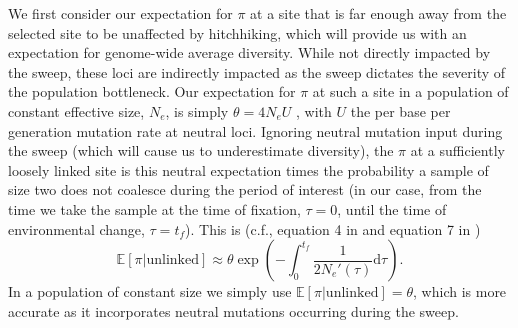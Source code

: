 \documentclass[]{article}
\begin{document}
We first consider our expectation for $\pi$ at a site that is far enough away from the selected site to be unaffected by hitchhiking, which will provide us with an expectation for  genome-wide average diversity.
While not directly impacted by the sweep, these loci are indirectly impacted as the sweep dictates the severity of the population bottleneck.
Our expectation for $\pi$ at such a site in a population of constant effective size, $N_e$, is simply $\theta = 4 N_e U$ \citep{watterson1975number}, with $U$ the per base per generation mutation rate at neutral loci.
Ignoring neutral mutation input during the sweep (which will cause us to underestimate diversity), the $\pi$ at a sufficiently loosely linked site is this neutral expectation times the probability a sample of size two does not coalesce during the period of interest (in our case, from the time we take the sample at the time of fixation, $\tau=0$, until the time of environmental change, $\tau=t_f$).
This is (c.f., equation 4 in \citealp{slatkin1991pairwise} and equation 7 in \citealp{griffiths1994sampling})
\begin{equation}\label{eq:EH_rescue_loose}
\mathbb{E}[\pi | \mathrm{unlinked}]\approx \theta \exp \left( - \int_0^{t_f} \frac{1}{2N_e'(\tau)} \mathrm{d}\tau \right). 
\end{equation}
In a population of constant size we simply use $\mathbb{E}[\pi | \mathrm{unlinked}]=\theta$, which is more accurate as it incorporates neutral mutations occurring during the sweep.
\end{document}
